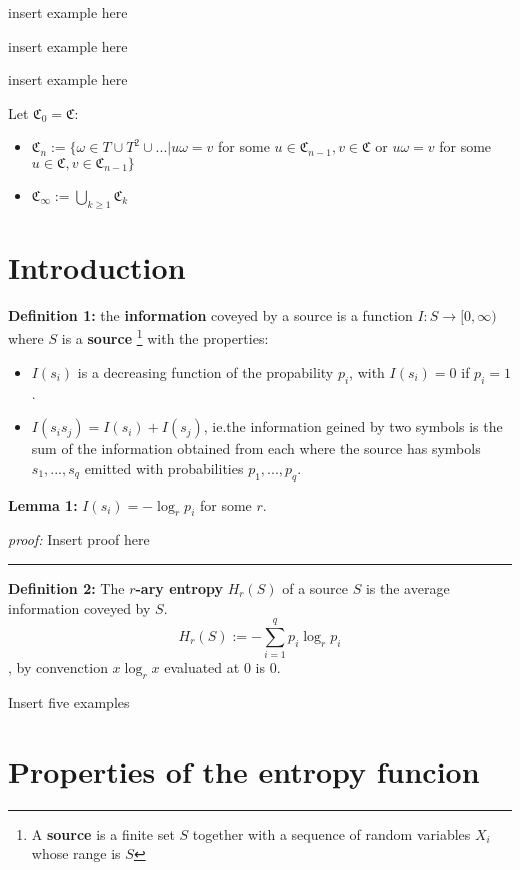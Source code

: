 \documentclass{article}
\begin{document}
insert example here

insert example here

insert example here
 
 
\noindent Let $\mathfrak{C}_0 = \mathfrak{C}$:

\begin{itemize}
	\item $\mathfrak{C}_n := \{   \omega \in T \cup T^2 \cup... | u\omega = v$ for some $u \in \mathfrak{C}_{n-1}, v \in \mathfrak{C}$ or $ u\omega = v$ for some $u \in \mathfrak{C}, v \in \mathfrak{C}_{n-1}   \}$
	\item $\mathfrak{C}_{\infty} := \bigcup_{k \geq 1} \mathfrak{C}_k$
\end{itemize}



		\section{Introduction}

\noindent\textbf{Definition 	1:} the \textbf{information} coveyed by a source is a function $I:S  \rightarrow [ 0, \infty ) $ where $S$ is a \textbf{source} \footnote{A \textbf{source} is a finite set $S$ together with a sequence of random variables $X_i$ whose range is $S$} with the properties:
		
		\begin{itemize}
			\item $I(s_i)$ is a decreasing function of the propability $p_i$, with $I(s_i) = 0$ if $p_i = 1$.
			\item $I(s_i s_j) = I(s_i) + I(s_j)$, ie.the information geined by two symbols is the sum of the information obtained from each where the source has symbols $s_1, ..., s_q$ emitted with probabilities $p_1, ..., p_q$.
		\end{itemize}
		
\noindent\textbf{Lemma 	1: } $I(s_i) = - \log_{r}{p_i}$ for some $r$.

\noindent\textit{proof:}  Insert proof here

\noindent
{\color{gray} \rule{\linewidth}{0.5mm} }

\noindent \textbf{Definition 	2:} The \textbf{$r$-ary entropy} $H_{r}(S)$ of a source $S$ is the average information coveyed by $S$.
$$
H_{r}(S) := - \sum_{i = 1}^{q} {p_i \log_{r}{p_i}}
$$
, by convenction $x \log_{r}{x}$ evaluated at $0$ is $0$.

Insert five examples

	\section{Properties of the entropy funcion}
	
\end{document}
